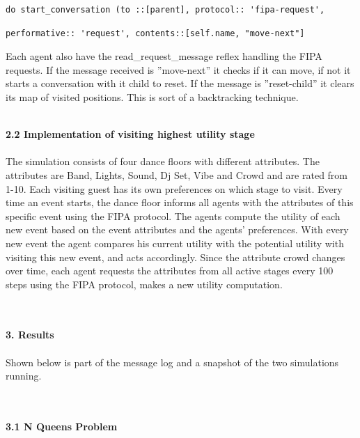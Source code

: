 \documentclass[a4paper,10pt]{article}
\begin{document}
\begin{verbatim}
do start_conversation (to ::[parent], protocol:: 'fipa-request', 	
\end{verbatim}
\begin{verbatim}
performative:: 'request', contents::[self.name, "move-next"]
\end{verbatim}
Each agent also have the read\_request\_message reflex handling the FIPA requests. If the message received is ”move-next” it checks if it can move, if not it starts a conversation with it child to reset. If the message is ”reset-child” it clears its map of visited positions. This is sort of a backtracking technique.  

\maketitle
\textbf
{\\2.2 Implementation of visiting highest utility stage\\\\}
The simulation consists of four dance floors with different attributes. The attributes are Band, Lights, Sound, Dj Set, Vibe and Crowd and are rated from 1-10. Each visiting guest has its own preferences on which stage to visit. Every time an event starts, the dance floor informs all agents with the attributes of this specific event using the FIPA protocol. The agents compute the utility of each new event based on the event attributes and the agents’ preferences. With every new event the agent compares his current utility with the potential utility with visiting this new event, and acts accordingly. Since the attribute crowd changes over time, each agent requests the attributes from all active stages every 100 steps using the FIPA protocol, makes a new utility computation.

\clearpage
\maketitle
\textbf
{\\\\3. Results\\\\}
Shown below is part of the message log and a snapshot of the two simulations running. 

\maketitle
\textbf
{\\\\3.1 N Queens Problem\\\\}
\end{document}
